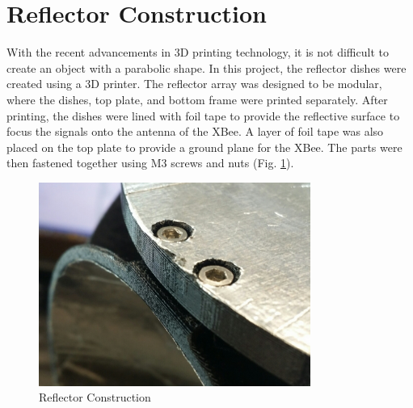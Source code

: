 \section{Reflector Construction}
With the recent advancements in 3D printing technology, it is not difficult to create an object with a parabolic shape. In this project, the reflector dishes were created using a 3D printer. The reflector array was designed to be modular, where the dishes, top plate, and bottom frame were printed separately. After printing, the dishes were lined with foil tape to provide the reflective surface to focus the signals onto the antenna of the XBee. A layer of foil tape was also placed on the top plate to provide a ground plane for the XBee. The parts were then fastened together using M3 screws and nuts (Fig. \ref{fig:reflectorConstruction}).
\begin{figure}
    \centering
    \includegraphics[width=3.5in]{figs/img/reflectorConstruction.jpg}
    \caption{Reflector Construction}
    \label{fig:reflectorConstruction}
\end{figure}


